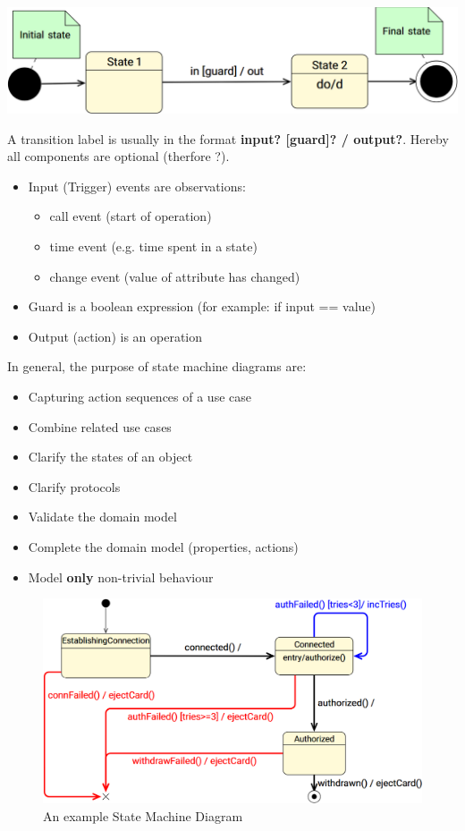 \documentclass[
../../Software_Engineering_Summary.tex,
]
{subfiles}
\begin{document}
\begin{defbox}
    [Transitions]
    \begin{center}
        \includegraphics[scale=0.4]{Pics/BehaviourTransitions.png}
    \end{center}
    A transition label is usually in the format \textbf{input? [guard]? / output?}. Hereby all components are optional (therfore ?).
    \begin{itemize}
        \item Input (Trigger) events are observations:
        \begin{itemize}
            \item call event (start of operation)
            \item time event (e.g. time spent in a state)
            \item change event (value of attribute has changed)
        \end{itemize}
        \item Guard is a boolean expression (for example: if input == value)
        \item Output (action) is an operation
    \end{itemize}
\end{defbox}

In general, the purpose of state machine diagrams are:
\begin{itemize}
    \item Capturing action sequences of a use case
    \item Combine related use cases
    \item Clarify the states of an object
    \item Clarify protocols
    \item Validate the domain model
    \item Complete the domain model (properties, actions)
    \item Model \textbf{only} non-trivial behaviour
\end{itemize}

\begin{figure}
    [htp]
    \centering
    \includegraphics[scale=0.5]{Pics/StateMachineDiagramExample.png}
    \caption{An example State Machine Diagram}
\end{figure}
\end{document}
